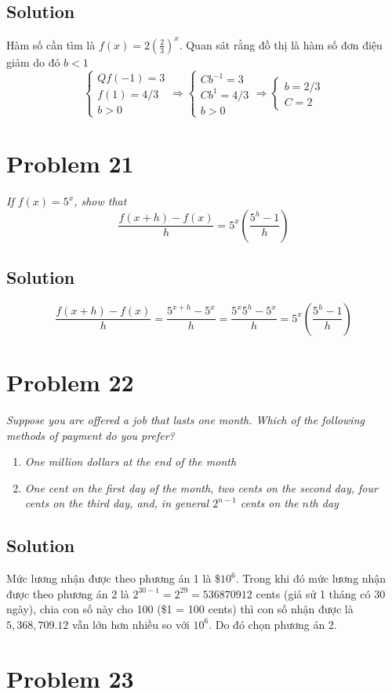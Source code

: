 \documentclass[11pt]{article}
\newcommand{\soln}{\subsection*}
\newcommand{\qn}{\textit}
\begin{document}
\soln{Solution}
Hàm số cần tìm là $f(x)=2(\frac{2}{3})^x$. Quan sát rằng đồ thị là hàm số đơn điệu giảm do đó $b<1$
\begin{equation*}
	\begin{cases}Q
		f(-1)=3 \\
		f(1)=4/3 \\
		b > 0
	\end{cases}
	\Rightarrow
	\begin{cases}
		Cb^{-1}=3 \\
		Cb^1=4/3 \\
		b > 0
	\end{cases}
	\Rightarrow
	\begin{cases}
		b=2/3 \\
		C=2
	\end{cases}
\end{equation*}

\section*{Problem 21}

\qn{If $f(x)=5^x$, show that $$\frac{f(x+h)-f(x)}{h}=5^x(\frac{5^h-1}{h})$$}

\soln{Solution}
$$\frac{f(x+h)-f(x)}{h}=\frac{5^{x+h}-5^x}{h}=\frac{5^x5^h-5^x}{h}=5^x(\frac{5^h-1}{h})$$

\section*{Problem 22}

\qn{Suppose you are offered a job that lasts one month. Which of the following methods of payment do you prefer?}
\begin{enumerate}
	\item \qn{One million dollars at the end of the month}
	
	\item \qn{One cent on the first day of the month, two cents on the second day, four cents on the third day, and, in general $2^{n-1}$ cents on the $n$th day}
\end{enumerate}

\soln{Solution}
Mức lương nhận được theo phương án 1 là \$$10^6$. Trong khi đó mức lương nhận được theo phương án 2 là $2^{30-1}=2^{29}=536870912$ cents (giả sử 1 tháng có 30 ngày), chia con số này cho 100 (\$1 = 100 cents) thì con số nhận được là $5,368,709.12$ vẫn lớn hơn nhiều so với $10^6$. Do đó chọn phương án 2.

\section*{Problem 23}
\end{document}
